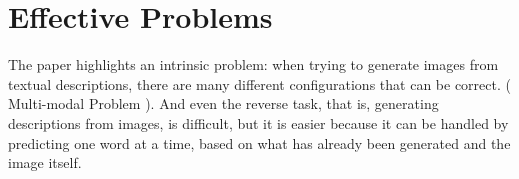 \section*{Effective Problems}
The paper highlights an intrinsic problem: when trying to generate images from textual descriptions, 
there are many different configurations that can be correct. ( Multi-modal Problem ). 
And even the reverse task, that is, generating descriptions from images, is difficult, 
but it is easier because it can be handled by predicting one word at a time, 
based on what has already been generated and the image itself.
